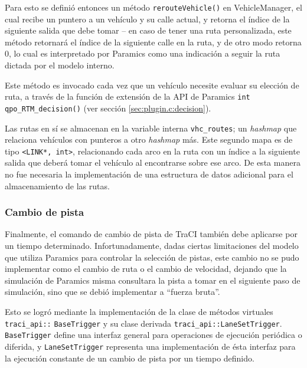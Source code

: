Para esto se definió entonces un método \texttt{rerouteVehicle()} en VehicleManager, el cual recibe un puntero a un vehículo y su calle actual, y retorna el índice de la siguiente salida que debe tomar -- en caso de tener una ruta personalizada, este método retornará el índice de la siguiente calle en la ruta, y de otro modo retorna 0, lo cual es interpretado por Paramics como una indicación a seguir la ruta dictada por el modelo interno.
\begin{figure}[htpb]

\end{figure}

Este método es invocado cada vez que un vehículo necesite evaluar su elección de ruta, a través de la función de extensión de la API de Paramics \texttt{int qpo\_RTM\_decision()} (ver sección \ref{sec:plugin.c:decision}).

Las rutas en sí se almacenan en la variable interna \texttt{vhc\_routes}; un \emph{hashmap} que relaciona vehículos con punteros a otro \emph{hashmap} más. Este segundo mapa es de tipo 
\texttt{<LINK*, int>}, relacionando cada arco en la ruta con un índice a la siguiente salida que deberá tomar el vehículo al encontrarse sobre ese arco. De esta manera no fue necesaria la implementación de una estructura de datos adicional para el almacenamiento de las rutas.

\subsubsection{Cambio de pista}\label{sec:laneoverride}

Finalmente, el comando de cambio de pista de TraCI también debe aplicarse por un tiempo determinado. Infortunadamente, dadas ciertas limitaciones del modelo que utiliza Paramics para controlar la selección de pistas, este cambio no se pudo implementar como el cambio de ruta o el cambio de velocidad, dejando que la simulación de Paramics misma consultara la pista a tomar en el siguiente paso de simulación, sino que se debió implementar a ``fuerza bruta''.

Esto se logró mediante la implementación de la clase de métodos virtuales \texttt{traci\_api::}
\texttt{BaseTrigger} y su clase derivada \texttt{traci\_api::LaneSetTrigger}. \texttt{BaseTrigger} define una interfaz general para operaciones de ejecución periódica o diferida, y \texttt{LaneSetTrigger} representa una implementación de ésta interfaz para la ejecución constante de un cambio de pista por un tiempo definido.

